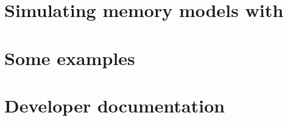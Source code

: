 \documentclass{article}
\begin{document}
\clearpage
\part{Simulating\label{part:herd} memory models with \herd}


%

\clearpage
\part{Some \label{part:examples} examples}


\clearpage
\part{Developer\label{part:devel} documentation}




\end{document}
